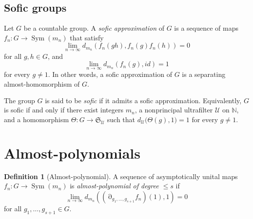 \documentclass[a4paper,12pt]{amsart}
\theoremstyle{plain}
\theoremstyle{definition}
\newtheorem*{definition}{{\bf Definition}}
\theoremstyle{remark}
\numberwithin{equation}{subsection}
\DeclareMathOperator{\Sym}{Sym}
\DeclareMathOperator{\mypartial}{\partial}
\begin{document}

    

\subsection{Sofic groups}
\label{ss:sofic_prelim}

Let $G$ be a countable group. A \emph{sofic approximation} of $G$ is a sequence of maps $f_n:G\to\Sym(m_n)$ that satisfy
$$\lim_{n\to\infty}d_{m_n}(f_n(gh),f_n(g)f_n(h))=0$$
for all $g,h\in G$, and 
$$\lim_{n\to\infty}d_{m_n}(f_n(g),id)=1$$
for every $g\neq 1$. In other words, a sofic approximation of $G$ is a separating almost-homomorphism of $G$.

The group $G$ is said to be \emph{sofic} if it admits a sofic approximation. Equivalently, $G$ is sofic if and only if there exist integers $m_n$, a nonprincipal ultrafilter
$\mathcal U$ on $\mathbb N$, and a homomorphism
$\Theta:G\to\mathfrak{S}_\mathcal{U}$
such that
$d_{\mathcal U}\bigl(\Theta(g),1\bigr)=1$
for every $g\neq1$.



\section{Almost-polynomials}
\label{s:almostpolynomials}

\noindent

\begin{definition}[Almost-polynomial]
    A sequence of 
    asymptotically unital 
    maps $f_n:G\to\Sym(m_n)$ is \emph{almost-polynomial of degree $\le s$} if
    $$\lim_{n\to\infty} d_{m_n}((\mypartial_{g_1,\ldots ,g_{s+1}}f_n)(1),1)=0$$
    for all $g_1,\ldots ,g_{s+1}\in G$.
\end{definition}
\end{document}
